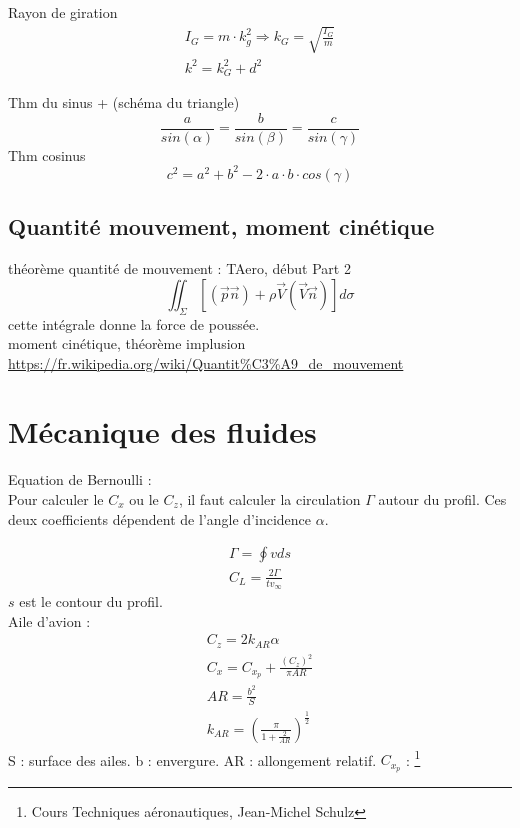 \documentclass[12pt,a4paper,twoside]{article}
\numberwithin{equation}{subsection}
\begin{document}
Rayon de giration
\begin{eqnarray}
I_G=m \cdot k_g^2 \Rightarrow k_G=\sqrt{\frac{I_G}{m}}\\
k^2=k_G^2+d^2
\end{eqnarray}

Thm du sinus + (schéma du triangle)
\begin{equation}
\frac{a}{sin(\alpha)}=\frac{b}{sin(\beta)}=\frac{c}{sin(\gamma)}
\end{equation}
Thm cosinus
\begin{equation}
c^2=a^2+b^2-2 \cdot a \cdot b \cdot cos(\gamma)
\end{equation}

\subsection{Quantité mouvement, moment cinétique}
théorème quantité de mouvement : TAero, début Part 2\\
\begin{equation}
\iint_\Sigma [(\vec{p} \vec{n})+\rho \vec{V}(\vec{V} \vec{n})]d\sigma
\end{equation}
cette intégrale donne la force de poussée. \\
moment cinétique, théorème implusion\\
\url{https://fr.wikipedia.org/wiki/Quantit%C3%A9_de_mouvement}

\newpage
\section{Mécanique des fluides}

Equation de Bernoulli : \\



Pour calculer le $C_x$ ou le $C_z$, il faut calculer la circulation $\Gamma$ autour du profil. Ces deux coefficients dépendent de l'angle d'incidence $\alpha$.

\begin{eqnarray}
\Gamma = \oint v ds\\
C_{L}=\frac{2 \Gamma}{t v_{\infty}}
\end{eqnarray}
$s$ est le contour du profil.\\


Aile d'avion :
\begin{eqnarray}
C_z=2 k_{AR} \alpha\\
C_x= C_{x_p} + \frac{(C_z)^2}{\pi AR}\\
AR=\frac{b^2}{S}\\
k_{AR}=(\frac{\pi}{1+\frac{2}{AR}})^{\frac{1}{2}}
\end{eqnarray}
S : surface des ailes. b : envergure. AR : allongement relatif. $C_{x_p}$ : \footnote{Cours Techniques aéronautiques, Jean-Michel Schulz}\\
\end{document}
